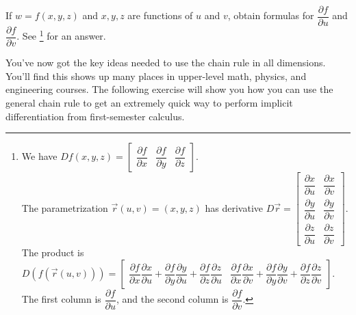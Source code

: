 \begin{review*}
 If $w=f(x,y,z)$ and $x,y,z$ are functions of $u$ and $v$, obtain formulas for $\dfrac{\partial f}{\partial u}$ and $\dfrac{\partial f}{\partial v}$.  
See \footnote{ We have 
$Df(x,y,z)
=\begin{bmatrix}\dfrac{\partial f}{\partial x}&\dfrac{\partial f}{\partial y}&\dfrac{\partial f}{\partial z}\end{bmatrix}$.\\ 
The parametrization $\vec r(u,v)=(x,y,z)$ has derivative 
$D\vec r 
=\begin{bmatrix}
\dfrac{\partial x}{\partial u}&\dfrac{\partial x}{\partial v}\\
\dfrac{\partial y}{\partial u}&\dfrac{\partial y}{\partial v}\\
\dfrac{\partial z}{\partial u}&\dfrac{\partial z}{\partial v}
\end{bmatrix}$. \\
The product is
$D(f(\vec r(u,v)))
=\begin{bmatrix}
\dfrac{\partial f}{\partial x}\dfrac{\partial x}{\partial u}+
\dfrac{\partial f}{\partial y}\dfrac{\partial y}{\partial u}+
\dfrac{\partial f}{\partial z}\dfrac{\partial z}{\partial u}&
\dfrac{\partial f}{\partial x}\dfrac{\partial x}{\partial v}+
\dfrac{\partial f}{\partial y}\dfrac{\partial y}{\partial v}+
\dfrac{\partial f}{\partial z}\dfrac{\partial z}{\partial v}
\end{bmatrix}
$. \\
The first column is $\dfrac{\partial f}{\partial u}$, and the second column is $\dfrac{\partial f}{\partial v}$.
} for an answer. 
\end{review*}

You've now got the key ideas needed to use the chain rule in all dimensions. You'll find this shows up many places in upper-level math, physics, and engineering courses. The following exercise will show you how you can use the general chain rule to get an extremely quick way to perform implicit differentiation from first-semester calculus.

